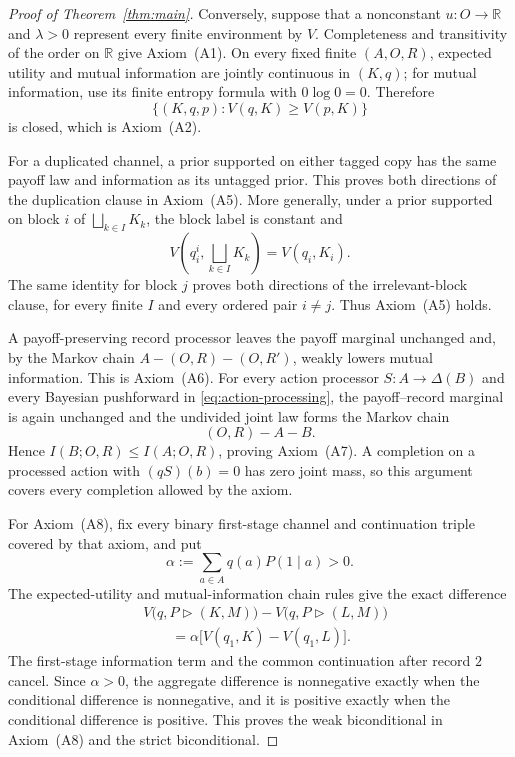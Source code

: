 \documentclass[11pt,a4paper]{article}
\theoremstyle{definition}
\newcommand{\D}{\Delta}
\newcommand{\R}{\mathbb R}
\newcommand{\1}{\mathbf 1}
\begin{document}
\begin{proof}[Proof of Theorem~\ref{thm:main}]
Conversely, suppose that a nonconstant $u:O\to\R$ and $\lambda>0$ represent
every finite environment by $V$.  Completeness and transitivity of the order
on $\R$ give Axiom~\textup{(A1)}.  On every fixed finite
$(A,O,R)$, expected utility and mutual information are jointly continuous in
$(K,q)$; for mutual information, use its finite entropy formula with
$0\log0=0$.  Therefore
\[
\{(K,q,p):V(q,K)\ge V(p,K)\}
\]
is closed, which is Axiom~\textup{(A2)}.

For a duplicated channel, a prior supported on either tagged copy has the same
payoff law and information as its untagged prior.  This proves both directions
of the duplication clause in Axiom~\textup{(A5)}.  More generally, under a
prior supported on block $i$ of $\bigsqcup_{k\in I}K_k$, the block label is
constant and
\[
V\left(q_i^i,\bigsqcup_{k\in I}K_k\right)=V(q_i,K_i).
\]
The same identity for block $j$ proves both directions of the
irrelevant-block clause, for every finite $I$ and every ordered pair
$i\ne j$.  Thus Axiom~\textup{(A5)} holds.

A payoff-preserving record processor leaves the payoff marginal unchanged and,
by the Markov chain
$A-(O,R)-(O,R')$, weakly lowers mutual information.  This is
Axiom~\textup{(A6)}.  For every action processor $S:A\to\D(B)$ and every
Bayesian pushforward in \eqref{eq:action-processing}, the payoff--record
marginal is again unchanged and the undivided joint law forms the Markov chain
\[
(O,R)-A-B.
\]
Hence $I(B;O,R)\le I(A;O,R)$, proving Axiom~\textup{(A7)}.  A completion on a
processed action with $(qS)(b)=0$ has zero joint mass, so this argument covers
every completion allowed by the axiom.

For Axiom~\textup{(A8)}, fix every binary first-stage channel and continuation
triple covered by that axiom, and put
\[
\alpha:=\sum_{a\in A}q(a)P(1\mid a)>0.
\]
The expected-utility and mutual-information chain rules give the exact
difference
\begin{align*}
&V\bigl(q,P\triangleright(K,M)\bigr)
 -V\bigl(q,P\triangleright(L,M)\bigr)\\
&\qquad=\alpha\bigl[V(q_1,K)-V(q_1,L)\bigr].
\end{align*}
The first-stage information term and the common continuation after record $2$
cancel.  Since $\alpha>0$, the aggregate difference is nonnegative exactly
when the conditional difference is nonnegative, and it is positive exactly
when the conditional difference is positive.  This proves the weak
biconditional in Axiom~\textup{(A8)} and the strict biconditional.


\end{proof}
\end{document}
